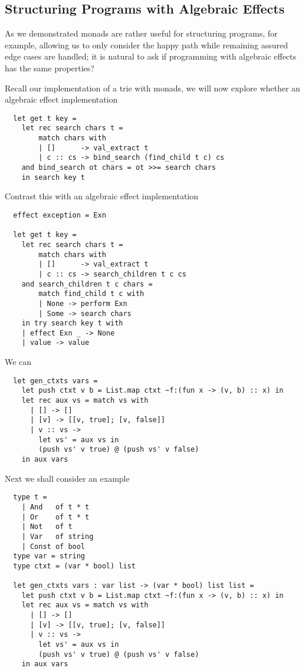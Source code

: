 \subsection{Structuring Programs with Algebraic Effects}
As we demonstrated monads are rather useful for structuring programs,
for example,
allowing us to only consider the happy path while remaining assured
edge cases are handled;
it is natural to ask if programming with algebraic effects
has the same properties?

Recall our implementation of a trie with monads,
we will now explore whether an algebraic effect implementation
\begin{verbatim}
  let get t key =
    let rec search chars t =
        match chars with
        | []      -> val_extract t
        | c :: cs -> bind_search (find_child t c) cs
    and bind_search ot chars = ot >>= search chars
    in search key t
\end{verbatim}

Contrast this with an algebraic effect implementation

\begin{verbatim}
  effect exception = Exn

  let get t key =
    let rec search chars t =
        match chars with
        | []      -> val_extract t
        | c :: cs -> search_children t c cs
    and search_children t c chars =
        match find_child t c with
        | None -> perform Exn
        | Some -> search chars
    in try search key t with
    | effect Exn _ -> None
    | value -> value
\end{verbatim}

We can 

\begin{verbatim}
  let gen_ctxts vars =
    let push ctxt v b = List.map ctxt ~f:(fun x -> (v, b) :: x) in
    let rec aux vs = match vs with
      | [] -> []
      | [v] -> [[v, true]; [v, false]]
      | v :: vs ->
        let vs' = aux vs in
        (push vs' v true) @ (push vs' v false)
    in aux vars
\end{verbatim}

Next we shall consider an example

\begin{verbatim}
  type t =
    | And   of t * t
    | Or    of t * t
    | Not   of t
    | Var   of string
    | Const of bool
  type var = string
  type ctxt = (var * bool) list

  let gen_ctxts vars : var list -> (var * bool) list list =
    let push ctxt v b = List.map ctxt ~f:(fun x -> (v, b) :: x) in
    let rec aux vs = match vs with
      | [] -> []
      | [v] -> [[v, true]; [v, false]]
      | v :: vs ->
        let vs' = aux vs in
        (push vs' v true) @ (push vs' v false)
    in aux vars
\end{verbatim}

